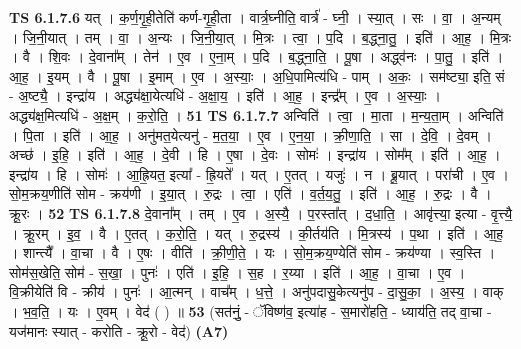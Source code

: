 \documentclass[17pt]{extarticle}
\begin{document}
                  \newline
                                \textbf{ TS 6.1.7.6} \newline
                  यत् । क॒र्ण॒गृ॒ही॒तेति॑ कर्ण-गृ॒ही॒ता । वार्त्र॒घ्नीति॒ वार्त्र॑ - घ्नी॒ । स्या॒त् । सः । वा॒ । अ॒न्यम् । जि॒नी॒यात् । तम् । वा॒ । अ॒न्यः । जि॒नी॒या॒त् । मि॒त्रः । त्वा॒ । प॒दि । ब॒द्ध्ना॒तु॒ । इति॑ । आ॒ह॒ । मि॒त्रः । वै । शि॒वः । दे॒वाना᳚म् । तेन॑ । ए॒व । ए॒ना॒म् । प॒दि । ब॒द्ध्ना॒ति॒ । पू॒षा । अद्ध्व॑नः । पा॒तु॒ । इति॑ । आ॒ह॒ । इ॒यम् । वै । पू॒षा । इ॒माम् । ए॒व । अ॒स्याः॒ । अ॒धि॒पामित्य॑धि - पाम् । अ॒कः॒ । सम॑ष्ट्या॒ इति॒ सं - अ॒ष्ट्यै॒ । इन्द्रा॑य । अद्ध्य॑क्षा॒येत्यधि॑ - अ॒क्षा॒य॒ । इति॑ । आ॒ह॒ । इन्द्र᳚म् । ए॒व । अ॒स्याः॒ । अद्ध्य॑क्ष॒मित्यधि॑ - अ॒क्ष॒म् । क॒रो॒ति॒ । \textbf{  51} \newline
                  \newline
                                \textbf{ TS 6.1.7.7} \newline
                  अन्विति॑ । त्वा॒ । मा॒ता । म॒न्य॒ता॒म् । अन्विति॑ । पि॒ता । इति॑ । आ॒ह॒ । अनु॑मत॒येत्यनु॑ - म॒त॒या॒ । ए॒व । ए॒न॒या॒ । क्री॒णा॒ति॒ । सा । दे॒वि॒ । दे॒वम् । अच्छ॑ । इ॒हि॒ । इति॑ । आ॒ह॒ । दे॒वी । हि । ए॒षा । दे॒वः । सोमः॑ । इन्द्रा॑य । सोम᳚म् । इति॑ । आ॒ह॒ । इन्द्रा॑य । हि । सोमः॑ । आ॒ह्रि॒यत॒ इत्या᳚ - ह्रि॒यते᳚ । यत् । ए॒तत् । यजुः॑ । न । ब्रू॒यात् । परा॑ची । ए॒व । सो॒म॒क्रय॒णीति॑ सोम - क्रय॑णी । इ॒या॒त् । रु॒द्रः । त्वा॒ । एति॑ । व॒र्त॒य॒तु॒ । इति॑ । आ॒ह॒ । रु॒द्रः । वै । क्रू॒रः । \textbf{  52} \newline
                  \newline
                                \textbf{ TS 6.1.7.8} \newline
                  दे॒वाना᳚म् । तम् । ए॒व । अ॒स्यै॒ । प॒रस्ता᳚त् । द॒धा॒ति॒ । आवृ॑त्त्या॒ इत्या - वृ॒त्त्यै॒ । क्रू॒रम् । इ॒व॒ । वै । ए॒तत् । क॒रो॒ति॒ । यत् । रु॒द्रस्य॑ । की॒र्तय॑ति । मि॒त्रस्य॑ । प॒था । इति॑ । आ॒ह॒ । शान्त्यै᳚ । वा॒चा । वै । ए॒षः । वीति॑ । क्री॒णी॒ते॒ । यः । सो॒म॒क्रय॒ण्येति॑ सोम - क्रय॑ण्या । स्व॒स्ति । सोम॑स॒खेति॒ सोम॑ - स॒खा॒ । पुनः॑ । एति॑ । इ॒हि॒ । स॒ह । र॒य्या । इति॑ । आ॒ह॒ । वा॒चा । ए॒व । वि॒क्रीयेति॑ वि - क्रीय॑ । पुनः॑ । आ॒त्मन् । वाच᳚म् । ध॒त्ते॒ । अनु॑पदासु॒केत्यनु॑प - दा॒सु॒का॒ । अ॒स्य॒ । वाक् । भ॒व॒ति॒ । यः । ए॒वम् । वेद॑ ( ) ॥ \textbf{  53 } \newline
                  \newline
                      (सत॑नुं॒ - ॅविष्ण॑व॒ इत्या॑ह - स॒मारो॑हति॒ - ध्याय॑ति॒ तद् वा॒चा - यज॑मानः स्यात् - करोति - क्रू॒रो - वेद॑)  \textbf{(A7)} \newline \newline
\end{document}
